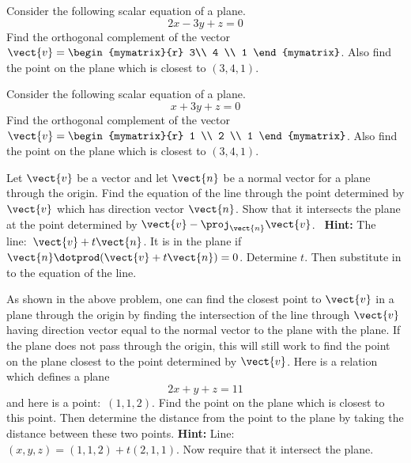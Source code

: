 
\begin{ex} Consider the following scalar equation of a plane.
\begin{equation*}
2x-3y+z=0
\end{equation*}
Find the orthogonal complement of the vector $\vect{v}=\begin{mymatrix}{r}
3\\
4 \\
1
\end{mymatrix}$.
Also find the point on the plane which is closest to $(3,4,1)$.
\end{ex}


\begin{ex} Consider the following scalar equation of a plane.
\begin{equation*}
x+3y+z=0
\end{equation*}
Find the orthogonal complement of the vector $\vect{v}=\begin{mymatrix}{r}
 1 \\
2 \\
1
\end{mymatrix}$.
Also find the point on the plane which is closest to $(3,4,1)$.
\end{ex}

\begin{ex} Let $\vect{v}$ be a vector and let $\vect{n}$ be a normal vector for a
plane through the origin. Find the equation of the line through the point
determined by $\vect{v}$ which has direction vector $\vect{n}$. Show that it
intersects the plane at the point determined by $\vect{v}-\proj_{\vect{n}
}\vect{v}$. \ \textbf{Hint: }The line:\ $\vect{v}+t\vect{n}$. It is in the
plane if $\vect{n}\dotprod (\vect{v}+t\vect{n}) =0$. Determine $t$.
Then substitute in to the equation of the line.
\end{ex}

\begin{ex} As shown in the above problem, one can find the closest point to $\vect{v}$ in a plane through the origin by finding the intersection of the line
through $\vect{v}$ having direction vector equal to the normal vector to the
plane with the plane. If the plane does not pass through the origin, this
will still work to find the point on the plane closest to the point
determined by $\vect{v}$. Here is a relation which defines a plane
\begin{equation*}
2x+y+z=11
\end{equation*}
and here is a point:\ $(1,1,2)$. Find the point on the plane
which is closest to this point. Then determine the distance from the point
to the plane by taking the distance between these two points. \textbf{Hint: }
Line: $(x,y,z) =(1,1,2) +t(2,1,1)$. Now
require that it intersect the plane. $\ $
\end{ex}

